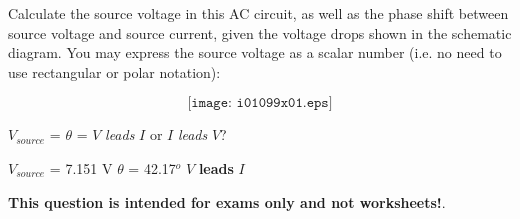 

Calculate the source voltage in this AC circuit, as well as the phase shift between source voltage and source current, given the voltage drops shown in the schematic diagram.  You may express the source voltage as a scalar number (i.e. no need to use rectangular or polar notation):

$$\texttt{[image: i01099x01.eps]}$$

$V_{source}$ = \hskip 100pt $\theta$ = \hskip 100pt $V$ {\it leads} $I$ or $I$ {\it leads} $V$? 

\vskip 10pt







$V_{source}$ = 7.151 V \hskip 100pt $\theta$ = 42.17$^{o}$ \hskip 100pt $V$ {\bf leads} $I$ 







{\bf This question is intended for exams only and not worksheets!}.



